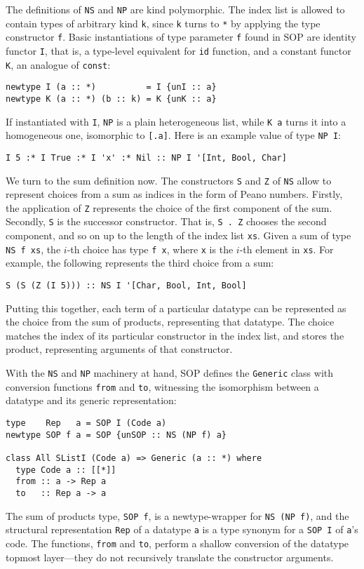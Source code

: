 \documentclass[runningheads]{llncs}
\newcommand{\K}[1]{\lstinline[style=fancy]{#1}}
\begin{document}
The definitions of \K{NS} and \K{NP} are kind polymorphic. The index list is allowed to contain types of arbitrary kind \K{k}, since \K{k} turns to \K{*} by applying the type constructor \K{f}.
Basic instantiations of type parameter \K{f} found in SOP are identity functor \K{I}, that is, a type-level equivalent for \K{id} function, and a constant functor \K{K}, an analogue of \K{const}:
\begin{lstlisting}[style=fancy]
newtype I (a :: *)          = I {unI :: a}
newtype K (a :: *) (b :: k) = K {unK :: a}
\end{lstlisting}
If instantiated with \K{I}, \K{NP} is a plain heterogeneous list, while \K{K a} turns it into a homogeneous one, isomorphic to \K{[.a]}. Here is an example value of type \K{NP I}:
\begin{lstlisting}[style=fancy]
I 5 :* I True :* I 'x' :* Nil :: NP I '[Int, Bool, Char]
\end{lstlisting}

We turn to the sum definition now. The constructors \K{S} and \K{Z} of \K{NS} allow to represent choices from a sum as indices in the form of Peano numbers. Firstly, the application of \K{Z} represents the choice of the first component of the sum. Secondly, \K{S} is the successor constructor. That is, \K{S . Z} chooses the second component, and so on up to the length of the index list \K{xs}. Given a sum of type \K{NS f xs}, the $i$-th choice has type \K{f x}, where \K{x} is the $i$-th element in \K{xs}. For example, the following represents the third choice from a sum:
\begin{lstlisting}[style=fancy]
S (S (Z (I 5))) :: NS I '[Char, Bool, Int, Bool]
\end{lstlisting}
Putting this together, each term of a particular datatype can be represented as the choice from the sum of products, representing that datatype. The choice matches the index of its particular constructor in the index list, and stores the product, representing arguments of that constructor.

With the \K{NS} and \K{NP} machinery at hand, SOP defines the \K{Generic} class with conversion functions \K{from} and \K{to}, witnessing the isomorphism between a datatype and its generic representation:
\begin{lstlisting}[style=fancy]
type    Rep   a = SOP I (Code a)
newtype SOP f a = SOP {unSOP :: NS (NP f) a}

class All SListI (Code a) => Generic (a :: *) where
  type Code a :: [[*]]
  from :: a -> Rep a
  to   :: Rep a -> a
\end{lstlisting}
The sum of products type, \K{SOP f}, is a newtype-wrapper for \K{NS (NP f)}, and the structural representation \K{Rep} of a datatype \K{a} is a type synonym for a \K{SOP I} of \K{a}'s code. The functions, \K{from} and \K{to}, perform a shallow conversion of the datatype topmost layer---they do not recursively translate the constructor arguments.
\end{document}
